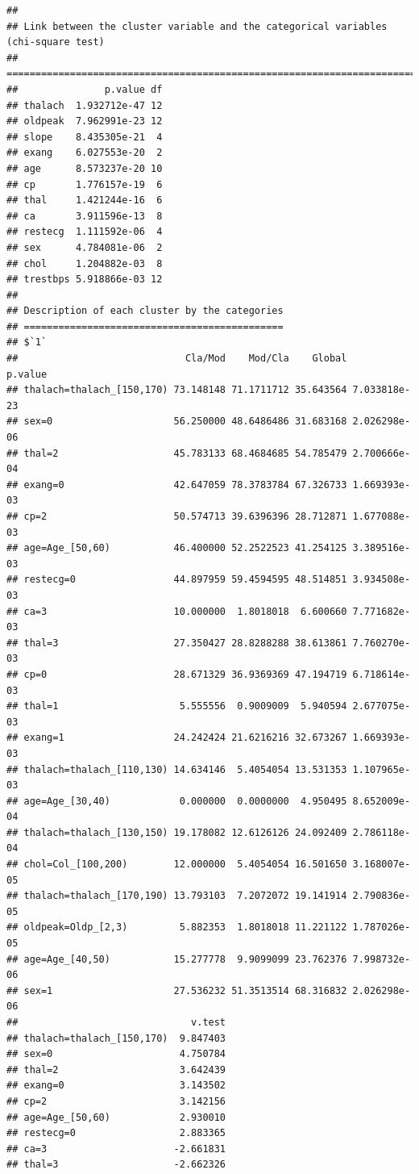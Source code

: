 \documentclass[]{article}
\begin{document}
\begin{verbatim}
## 
## Link between the cluster variable and the categorical variables (chi-square test)
## =================================================================================
##               p.value df
## thalach  1.932712e-47 12
## oldpeak  7.962991e-23 12
## slope    8.435305e-21  4
## exang    6.027553e-20  2
## age      8.573237e-20 10
## cp       1.776157e-19  6
## thal     1.421244e-16  6
## ca       3.911596e-13  8
## restecg  1.111592e-06  4
## sex      4.784081e-06  2
## chol     1.204882e-03  8
## trestbps 5.918866e-03 12
## 
## Description of each cluster by the categories
## =============================================
## $`1`
##                             Cla/Mod    Mod/Cla    Global      p.value
## thalach=thalach_[150,170) 73.148148 71.1711712 35.643564 7.033818e-23
## sex=0                     56.250000 48.6486486 31.683168 2.026298e-06
## thal=2                    45.783133 68.4684685 54.785479 2.700666e-04
## exang=0                   42.647059 78.3783784 67.326733 1.669393e-03
## cp=2                      50.574713 39.6396396 28.712871 1.677088e-03
## age=Age_[50,60)           46.400000 52.2522523 41.254125 3.389516e-03
## restecg=0                 44.897959 59.4594595 48.514851 3.934508e-03
## ca=3                      10.000000  1.8018018  6.600660 7.771682e-03
## thal=3                    27.350427 28.8288288 38.613861 7.760270e-03
## cp=0                      28.671329 36.9369369 47.194719 6.718614e-03
## thal=1                     5.555556  0.9009009  5.940594 2.677075e-03
## exang=1                   24.242424 21.6216216 32.673267 1.669393e-03
## thalach=thalach_[110,130) 14.634146  5.4054054 13.531353 1.107965e-03
## age=Age_[30,40)            0.000000  0.0000000  4.950495 8.652009e-04
## thalach=thalach_[130,150) 19.178082 12.6126126 24.092409 2.786118e-04
## chol=Col_[100,200)        12.000000  5.4054054 16.501650 3.168007e-05
## thalach=thalach_[170,190) 13.793103  7.2072072 19.141914 2.790836e-05
## oldpeak=Oldp_[2,3)         5.882353  1.8018018 11.221122 1.787026e-05
## age=Age_[40,50)           15.277778  9.9099099 23.762376 7.998732e-06
## sex=1                     27.536232 51.3513514 68.316832 2.026298e-06
##                              v.test
## thalach=thalach_[150,170)  9.847403
## sex=0                      4.750784
## thal=2                     3.642439
## exang=0                    3.143502
## cp=2                       3.142156
## age=Age_[50,60)            2.930010
## restecg=0                  2.883365
## ca=3                      -2.661831
## thal=3                    -2.662326

\end{verbatim}
\end{document}
